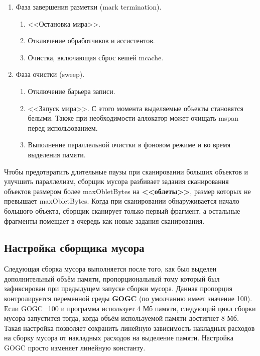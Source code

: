 \begin{enumerate}[label*=\arabic*.]
	\item Фаза завершения разметки (mark termination).
	\begin{enumerate}[label*=\arabic*.]
		\item <<Остановка мира>>.
		\item Отключение обработчиков и ассистентов.
		\item Очистка, включающая сброс кешей mcache.
	\end{enumerate}

	\item Фаза очистки (sweep).
	\begin{enumerate}[label*=\arabic*.]
		\item Отключение барьера записи.
		\item <<Запуск мира>>. С этого момента выделяемые объекты становятся белыми. Также при необходимости аллокатор может очищать mspan перед использованием.
		\item Выполнение параллельной очистки в фоновом режиме и во время выделения памяти.
	\end{enumerate}
\end{enumerate}

Чтобы предотвратить длительные паузы при сканировании больших объектов и улучшить параллелизм, сборщик мусора разбивает задания сканирования объектов размером более maxObletBytes на \textbf{<<облеты>>}, размер которых не превышает maxObletBytes. Когда при сканировании обнаруживается начало большого объекта, сборщик сканирует только первый фрагмент, а остальные фрагменты помещает в очередь как новые задания сканирования. \cite{golang_gc}



\subsection{Настройка сборщика мусора}

Следующая сборка мусора выполняется после того, как был выделен дополнительный объём памяти, пропорциональный тому который был зафиксирован при предыдущем запуске сборки мусора. Данная пропорция контролируется переменной среды \textbf{GOGC} (по умолчанию  имеет значение 100). Если GOGC=100 и программа использует 4 Мб памяти, следующий цикл сборки мусора запустится тогда, когда объём используемой памяти достигнет 8 Мб. Такая настройка позволяет сохранить линейную зависимость накладных расходов на сборку мусора от накладных расходов на выделение памяти. Настройка GOGC просто изменяет линейную константу. \cite{golang_gc}

